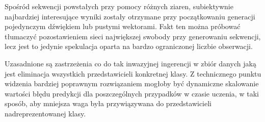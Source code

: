 {{        Spośród sekwencji powstałych przy pomocy różnych ziaren, subiektywnie najbardziej interesujące wyniki
        zostały otrzymane przy początkowaniu generacji pojedynczym dźwiękiem lub pustymi wektorami.
        Fakt ten można próbować tłumaczyć pozostawieniem sieci największej swobody przy generowaniu sekwencji, lecz
        jest to jedynie spekulacja oparta na bardzo ograniczonej liczbie obserwacji.

        \bigskip

        Uzasadnione są zastrzeżenia co do tak inwazyjnej ingerencji w\,\,zbiór danych jaką jest eliminacja 
        wszystkich przedstawicieli konkretnej klasy. Z\,\,technicznego punktu widzenia bardziej poprawnym 
        rozwiązaniem mogłoby być dynamiczne skalowanie wartości błędu predykcji dla poszczególnych przypadków w\,\,czasie uczenia, 
        w\,\,taki sposób, aby mniejsza waga była przywiązywana do przedstawicieli nadreprezentowanej klasy.
    }
}